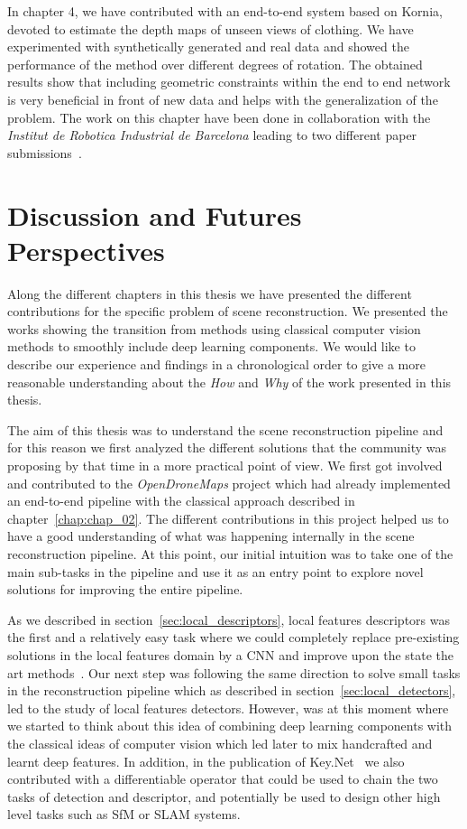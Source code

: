 In chapter 4, we have contributed with an end-to-end system based on Kornia, devoted to estimate the depth maps of unseen views of clothing. We have experimented with synthetically generated and real data and showed the performance of the method over different degrees of rotation. The obtained results show that including geometric constraints within the end to end network is very beneficial in front of new data and helps with the generalization of the problem. The work on this chapter have been done in collaboration with the \textit{Institut de Robotica Industrial de Barcelona} leading to two different paper submissions~\cite{eriba2020icra, eriba2020cvpr}.

\section{Discussion and Futures Perspectives}

Along the different chapters in this thesis we have presented the different contributions for the specific problem of scene reconstruction. We presented the works showing the transition from methods using classical computer vision methods to smoothly include deep learning components. We would like to describe our experience and findings in a chronological order to give a more reasonable understanding about the \textit{How} and \textit{Why} of the work presented in this thesis.

The aim of this thesis was to understand the scene reconstruction pipeline and for this reason we first analyzed the different solutions that the community was proposing by that time in a more practical point of view. We first got involved and contributed to the \textit{OpenDroneMaps} project which had already implemented an end-to-end pipeline with the classical approach described in chapter~\ref{chap:chap_02}. The different contributions in this project helped us to have a good understanding of what was happening internally in the scene reconstruction pipeline. At this point, our initial intuition was to take one of the main sub-tasks in the pipeline and use it as an entry point to explore novel solutions for improving the entire pipeline.

As we described in section~\ref{sec:local_descriptors}, local features descriptors was the first and a relatively easy task where we could completely replace pre-existing solutions in the local features domain by a CNN and improve upon the state the art methods~\cite{balntas2016bmvc}. Our next step was following the same direction to solve small tasks in the reconstruction pipeline which as described in section~\ref{sec:local_detectors}, led to the study of local features detectors. However, was at this moment where we started to think about this idea of combining deep learning components with the classical ideas of computer vision which led later to mix handcrafted and learnt deep features. In addition, in the publication of Key.Net~\cite{barroso2019keynet} we also contributed with a differentiable operator that could be used to chain the two tasks of detection and descriptor, and potentially be used to design other high level tasks such as SfM or SLAM systems.

